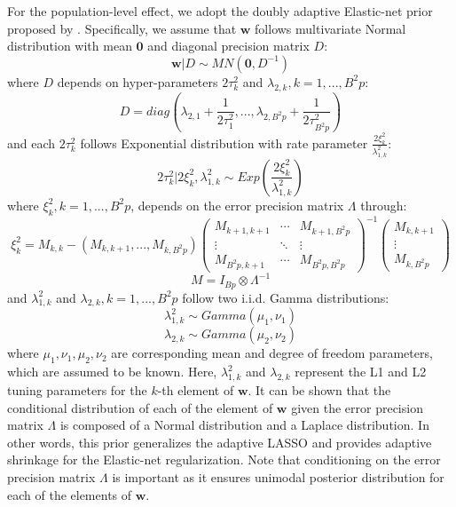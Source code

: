 \documentclass[12pt]{elsarticle}
\begin{document}
	For the population-level effect, we adopt the doubly adaptive Elastic-net prior proposed by \cite{Gefang}.
	Specifically, we assume that $\boldsymbol{w}$ follows multivariate Normal distribution with mean $\boldsymbol{0}$ and diagonal precision matrix $D$: 
	\begin{equation} \label{eq:4}
		\boldsymbol{w} | D  \sim MN \left( \boldsymbol{0},  D^{-1} \right)
	\end{equation}
	where $D$ depends on hyper-parameters $2\tau_k^2$ and $\lambda_{2,k}, k=1,...,B^2p$:
	\begin{equation} \label{eq:5}
		D=diag\left( \lambda_{2,1}+\frac{1}{2\tau_1^2},...,\lambda_{2,B^2p}+\frac{1}{2\tau_{B^2p}^2}\right)
	\end{equation}
	and each $2{\tau}_k^2$ follows Exponential distribution with rate parameter $\frac{2\xi_k^2}{\lambda_{1,k}^2}$:
	\begin{equation} \label{eq:6}
		2\tau_k^2 | 2\xi_k^2, \lambda_{1,k}^2 \sim Exp\left( \frac{2\xi_k^2}{\lambda_{1,k}^2}\right)
	\end{equation}
	where $\xi_k^2, k=1,...,B^2p$, depends on the error precision matrix $\Lambda$ through:
	\begin{equation} \label{eq:7}
		\xi_k^2=M_{k,k}-\left(M_{k,k+1},...,M_{k,B^2p}\right)
		{\begin{pmatrix}
				M_{k+1,k+1} & \cdots & M_{k+1, B^2p} \\
				\vdots & \ddots & \vdots \\
				M_{B^2p,k+1}  & \cdots & M_{B^2p,B^2p} 
			\end{pmatrix}}^{-1}
			\begin{pmatrix}
				M_{k,k+1}\\
				\vdots \\
				M_{k,B^2p}
			\end{pmatrix}
		\end{equation}
		\begin{equation} \label{eq:8}
			M=I_{Bp} \otimes \Lambda^{-1}
		\end{equation}
		and $\lambda_{1,k}^2$ and $\lambda_{2,k}, k=1,...,B^2p$ follow two i.i.d. Gamma distributions:
		\begin{equation} \label{eq:9}
			\lambda_{1,k}^2 \sim Gamma(\mu_1, \nu_1)
		\end{equation}
		\begin{equation} \label{eq:10}
			\lambda_{2,k} \sim Gamma(\mu_2, \nu_2)
		\end{equation}
		where $\mu_1, \nu_1, \mu_2, \nu_2$ are corresponding mean and degree of freedom parameters, which are assumed to be known.
		Here, $\lambda_{1,k}^2$ and $\lambda_{2,k}$ represent the L1 and L2 tuning parameters for the $k$-th element of $\boldsymbol{w}$.
		It can be shown that the conditional distribution of each of the element of $\boldsymbol{w}$ given the error precision matrix $\Lambda$ is composed of a Normal distribution and a Laplace distribution.
		In other words, this prior generalizes the adaptive LASSO and provides adaptive shrinkage for the Elastic-net regularization. 
		Note that conditioning on the error precision matrix $\Lambda$ is important as it ensures unimodal posterior distribution for each of the elements of $\boldsymbol{w}$\cite{Park}.
		
\end{document}
